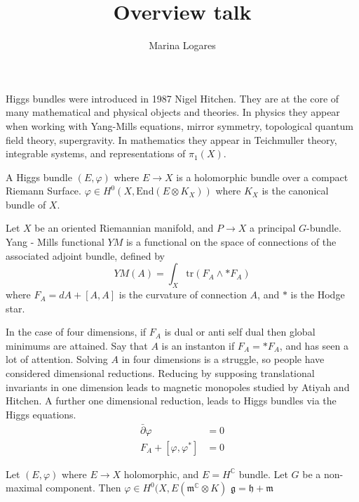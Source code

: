 % 


\title{Overview talk}
\author{Marina Logares}
\date{}

 
\maketitle

Higgs bundles were introduced in 1987 Nigel Hitchen.
They are at the core of many mathematical and physical objects and theories.
In physics they appear when working with Yang-Mills equations, mirror symmetry, topological quantum field theory, supergravity.
In mathematics they appear in Teichmuller theory, integrable systems, and representations of $ \pi_1 (X) $. 

\begin{definition}
    A Higgs bundle $(E, \varphi) $ where $ E \rightarrow  X $ is a holomorphic bundle over a compact Riemann Surface. 
    $ \varphi \in H^0 ( X, \mathrm{End} (E \otimes K _X) ) $ where $K_X$ is the canonical bundle of $X$. 
\end{definition}

Let $X$ be an oriented Riemannian manifold, and $P \rightarrow X$ a principal $G$-bundle. 
Yang - Mills functional $YM$ is a functional on the space of connections of the associated adjoint bundle, defined by
\begin{equation}
    YM(A) = \int_X \mathrm{tr}(F_A \wedge * F_A) 
\end{equation}
where $ F_A= dA + [A, A] $ is the curvature of connection $A$, and $*$ is the Hodge star. 

In the case of four dimensions, if $F_A$ is dual or anti self dual then global minimums are attained.
Say that $A$ is an instanton if $ F_A = * F_A $, and has seen a lot of attention.
Solving $A$ in four dimensions is a struggle, so people have considered dimensional reductions. 
Reducing by supposing translational invariants in one dimension leads to magnetic monopoles studied by Atiyah and Hitchen.
A further one dimensional reduction, leads to Higgs bundles via the Higgs equations. 
\begin{align}
    \bar{\partial} \varphi & = 0 \\
    F_A + [ \varphi , \varphi^* ] &= 0 
\end{align}


Let $(E,\varphi) $ where $ E \rightarrow  X$ holomorphic, 
and $ E = H^\mathbb{C} $ bundle.
Let $ G$ be a non-maximal component. 
Then $ \varphi \in H ^0 ( X, E(\mathfrak{m}^ \mathbb{C} \otimes K) $
$\mathfrak{g} = \mathfrak{h} + \mathfrak{m} $ 

